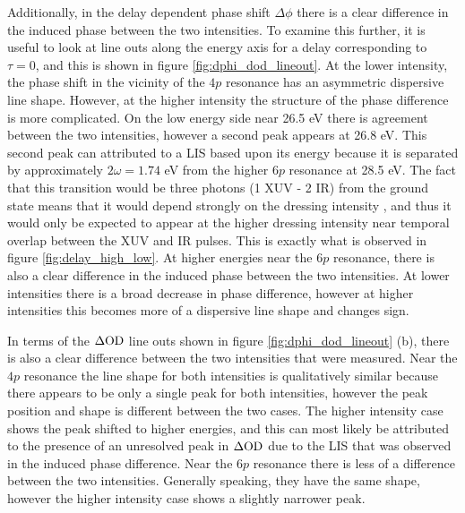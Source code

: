 Additionally, in the delay dependent phase shift $\Delta\phi$ there is a clear difference in the induced phase between the two intensities.  To examine this further, it is useful to look at line outs along the energy axis for a delay corresponding to $\tau=0$, and this is shown in figure \ref{fig:dphi_dod_lineout}.  At the lower intensity, the phase shift in the vicinity of the $4p$ resonance has an asymmetric dispersive line shape.  However, at the higher intensity the structure of the phase difference is more complicated.  On the low energy side near 26.5 eV there is agreement between the two intensities, however a second peak appears at 26.8 eV.  This second peak can attributed to a LIS based upon its energy because it is separated by approximately $2\omega=1.74$  eV from the higher $6p$ resonance at 28.5 eV.  The fact that this transition would be three photons (1 XUV - 2 IR) from the ground state means that it would depend strongly on the dressing intensity \cite{shankarPrinciplesQuantumMechanics2013}, and thus it would only be expected to appear at the higher dressing intensity near temporal overlap between the XUV and IR pulses.  This is exactly what is observed in figure \ref{fig:delay_high_low}. At higher energies near the $6p$ resonance, there is also a clear difference in the induced phase between the two intensities.  At lower intensities there is a broad decrease in phase difference, however at higher intensities this becomes more of a dispersive line shape and changes sign.

In terms of the $\Delta\mathrm{OD}$ line outs shown in figure \ref{fig:dphi_dod_lineout} (b), there is also a clear difference between the two intensities that were measured.  Near the $4p$ resonance the line shape for both intensities is qualitatively similar because there appears to be only a single peak for both intensities, however the peak position and shape is different between the two cases.  The higher intensity case shows the peak shifted to higher energies, and this can most likely be attributed to the presence of an unresolved peak in $\Delta\mathrm{OD}$ due to the LIS that was observed in the induced phase difference.  Near the $6p$ resonance there is less of a difference between the two intensities.  Generally speaking, they have the same shape, however the higher intensity case shows a slightly narrower peak.

